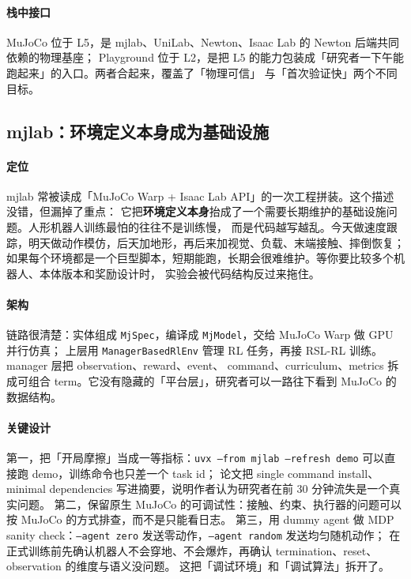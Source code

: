 \documentclass[UTF8, 11pt, a4paper, fontset=windows]{ctexart}
\newcommand{\term}[1]{\texttt{#1}}
\begin{document}
\paragraph{栈中接口}
MuJoCo 位于 L5，是 mjlab、UniLab、Newton、Isaac Lab 的 Newton 后端共同依赖的物理基座；
Playground 位于 L2，是把 L5 的能力包装成「研究者一下午能跑起来」的入口。两者合起来，覆盖了「物理可信」
与「首次验证快」两个不同目标。

\subsection{mjlab：环境定义本身成为基础设施}

\paragraph{定位}
mjlab 常被读成「MuJoCo Warp + Isaac Lab API」的一次工程拼装。这个描述没错，但漏掉了重点：
它把\textbf{环境定义本身}抬成了一个需要长期维护的基础设施问题。人形机器人训练最怕的往往不是训练慢，
而是代码越写越乱。今天做速度跟踪，明天做动作模仿，后天加地形，再后来加视觉、负载、末端接触、摔倒恢复；
如果每个环境都是一个巨型脚本，短期能跑，长期会很难维护。等你要比较多个机器人、本体版本和奖励设计时，
实验会被代码结构反过来拖住。

\paragraph{架构}
链路很清楚：实体组成 \term{MjSpec}，编译成 \term{MjModel}，交给 MuJoCo Warp 做 GPU 并行仿真；
上层用 \term{ManagerBasedRlEnv} 管理 RL 任务，再接 RSL-RL 训练。manager 层把 observation、reward、event、
command、curriculum、metrics 拆成可组合 term。它没有隐藏的「平台层」，研究者可以一路往下看到 MuJoCo 的数据结构。

\paragraph{关键设计}
第一，把「开局摩擦」当成一等指标：\term{uvx --from mjlab --refresh demo} 可以直接跑 demo，训练命令也只差一个 task id；
论文把 single command install、minimal dependencies 写进摘要，说明作者认为研究者在前 30 分钟流失是一个真实问题。
第二，保留原生 MuJoCo 的可调试性：接触、约束、执行器的问题可以按 MuJoCo 的方式排查，而不是只能看日志。
第三，用 dummy agent 做 MDP sanity check：\term{--agent zero} 发送零动作，\term{--agent random} 发送均匀随机动作；
在正式训练前先确认机器人不会穿地、不会爆炸，再确认 termination、reset、observation 的维度与语义没问题。
这把「调试环境」和「调试算法」拆开了。
\end{document}
